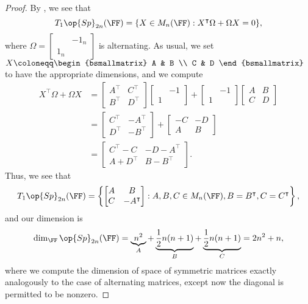 \documentclass[../notes.tex]{subfiles}
\begin{document}
\begin{proof}
	By , we see that
	\[T_1\op{Sp}_{2n}(\FF)=\{X\in M_n(\FF):X^\intercal\Omega+\Omega X=0\},\]
	where $\Omega=\begin{bmatrix}
		& -1_n \\ 1_n
	\end{bmatrix}$ is alternating. As usual, we set $X\coloneqq\begin{bsmallmatrix}
		A & B \\ C & D
	\end{bsmallmatrix}$ to have the appropriate dimensions, and we compute
	\begin{align*}
		X^\intercal\Omega+\Omega X &= \begin{bmatrix}
			A^\intercal & C^\intercal \\ B^\intercal & D^\intercal
		\end{bmatrix}\begin{bmatrix}
			& -1 \\ 1
		\end{bmatrix}+\begin{bmatrix}
			& -1 \\ 1
		\end{bmatrix}\begin{bmatrix}
			A & B \\ C & D
		\end{bmatrix} \\
		&= \begin{bmatrix}
			C^\intercal & -A^\intercal \\
			D^\intercal & -B^\intercal
		\end{bmatrix}+\begin{bmatrix}
			-C & -D \\
			A & B
		\end{bmatrix} \\
		&= \begin{bmatrix}
			C^\intercal-C & -D-A^\intercal \\
			A+D^\intercal & B-B^\intercal
		\end{bmatrix}.
	\end{align*}
	Thus, we see that
	\[T_1\op{Sp}_{2n}(\FF)=\left\{\begin{bmatrix}
		A & B \\ C & -A^\intercal
	\end{bmatrix}:A,B,C\in M_n(\FF),B=B^\intercal,C=C^\intercal\right\},\]
	and our dimension is
	\[\dim_\FF\op{Sp}_{2n}(\FF)=\underbrace{n^2}_A+\underbrace{\frac12n(n+1)}_B+\underbrace{\frac12n(n+1)}_C=2n^2+n,\]
	where we compute the dimension of space of symmetric matrices exactly analogously to the case of alternating matrices, except now the diagonal is permitted to be nonzero.
\end{proof}
\end{document}
